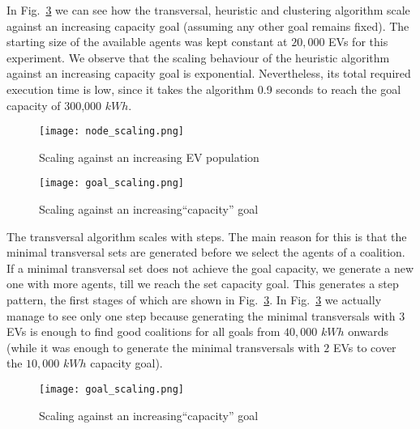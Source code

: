 In Fig.~\ref{fig:goalscale} %
we can see how the transversal, heuristic and clustering algorithm scale against an increasing capacity goal (assuming any other goal remains fixed). The starting size of the available agents was kept constant at $20,000$ EVs for this experiment. We observe that the scaling behaviour of the heuristic algorithm against an increasing capacity goal is exponential. %
Nevertheless, its total required execution time is low, since it takes the algorithm 0.9 seconds to reach the goal capacity of 300,000 $kWh$.
\begin{figure}
	\centering
		\texttt{[image: node\_scaling.png]}
		\caption{Scaling against an increasing
			\newline EV population\label{fig:popscale}}
\end{figure}
\begin{figure}
		\centering
		\texttt{[image: goal\_scaling.png]}
		\caption{Scaling against an increasing\newline ``capacity'' goal\label{fig:goalscale}}
\end{figure}
The transversal algorithm scales with steps. The main reason for this is that the minimal transversal sets are generated before we select the agents of a coalition. If a minimal transversal set does not achieve the goal capacity, we generate a new one with more agents, till we reach the set capacity goal. This generates a step pattern, the first stages of which are shown in Fig.~\ref{fig:goalscale}. In Fig.~\ref{fig:goalscale} we actually manage to see only one step because generating the minimal transversals with $3$ EVs is enough to find good coalitions for all goals from $40,000$ $kWh$ onwards (while it was enough to generate the minimal transversals with $2$ EVs to cover the $10,000$ $kWh$ capacity goal). %
\begin{figure}
	\centering
	\texttt{[image: goal\_scaling.png]}
	\caption{Scaling against an increasing\newline ``capacity'' goal\label{fig:goalscale}}
\end{figure}
